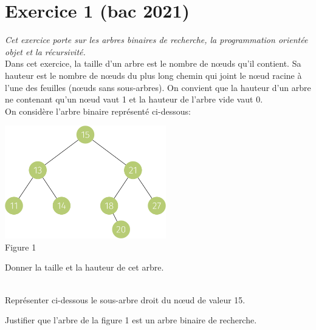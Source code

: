 \documentclass[a4paper,12pt,eval,firamath]{nsi}
\begin{document}
\maketitle

\section*{Exercice 1 \small (bac 2021)}
\resetquestion
\textit{Cet exercice porte sur les arbres binaires de recherche, la programmation orientée
      objet et la récursivité.}\\

Dans cet exercice, la taille d'un arbre est le nombre de nœuds qu'il contient. Sa hauteur
est le nombre de nœuds du plus long chemin qui joint le nœud racine à l'une des
feuilles (nœuds sans sous-arbres). On convient que la hauteur d'un arbre ne contenant
qu'un nœud vaut 1 et la hauteur de l'arbre vide vaut 0.\\

On considère l'arbre binaire représenté ci-dessous:
\begin{center}
      \includegraphics[width=7cm]{img/fig1.png}\\
      Figure 1
\end{center}
Donner la taille et la hauteur de cet arbre.\\

\\

\newpage 

\question Représenter ci-dessous le sous-arbre droit du n\oe ud de valeur 15.\\


\question Justifier que l'arbre de la figure 1 est un arbre binaire de recherche.\\
\end{document}
